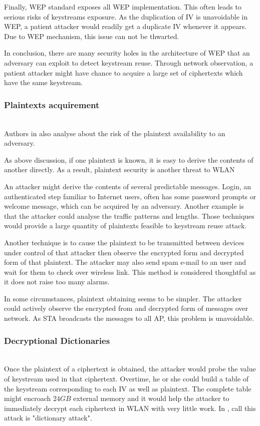 Finally, \ac{WEP} standard exposes all \ac{WEP} implementation. This often leads to serious risks of keystreams exposure. As the duplication of \ac{IV} is unavoidable in \ac{WEP}, a patient attacker would readily get a duplicate \ac{IV} whenever it appears. Due to \ac{WEP} mechanism, this issue can not be thwarted.

In conclusion, there are many security holes in the architecture of \ac{WEP} that an adversary can exploit to detect keystream reuse. Through network observation, a patient attacker might have chance to acquire a large set of ciphertexts which have the same keystream.

\subsubsection{Plaintexts acquirement}~\\
Authors in \cite{borisov2001intercepting} also analyse about the risk of the plaintext availability to an adversary.

As above discussion, if one plaintext is known, it is easy to derive the contents of another directly. As a result, plaintext security is another threat to \ac{WLAN}

An attacker might derive the contents of several predictable messages. Login, an authenticated step familiar to Internet users, often has some password prompts or welcome message, which can be acquired by an adversary. Another example is that the attacker could analyse the traffic patterns and lengths. Those techniques would provide a large quantity of plaintexts feasible to keystream reuse attack.

Another technique is to cause the plaintext to be transmitted between devices under control of that attacker then observe the encrypted form and decrypted form of that plaintext. The attacker may also send spam e-mail to an user and wait for them to check over wireless link. This method is considered thoughtful as it does not raise too many alarms.

In some circumstances, plaintext obtaining seems to be simpler. The attacker could actively observe the encrypted from and decrypted form of messages over network. As \ac{STA} broadcasts the messages to all \ac{AP}, this problem is unavoidable.

\subsubsection{Decryptional Dictionaries}~\\
Once the plaintext of a ciphertext is obtained, the attacker would probe the value of keystream used in that ciphertext. Overtime, he or she could build a table of the keystream corresponding to each \ac{IV} as well as plaintext. The complete table might encroach $24GB$ external memory and it would help the attacker to immediately decrypt each ciphertext in \ac{WLAN} with very little work. In \cite{al2006ieee}, \citeauthor{al2006ieee} call this attack is "dictionary attack".



